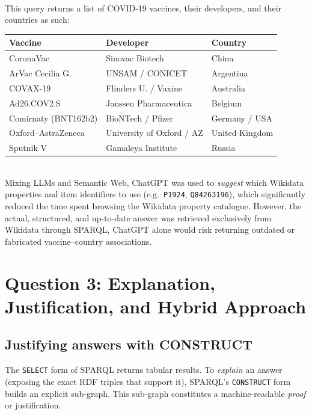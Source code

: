 \documentclass[12pt,a4paper]{article}
\begin{document}
\text{ }\\
This query returns a list of COVID-19 vaccines, their developers, and their countries as such:  
\begin{center}
\begin{tabular}{lll}
\toprule
\textbf{Vaccine} & \textbf{Developer} & \textbf{Country} \\
\midrule
CoronaVac            & Sinovac Biotech            & China \\
ArVac Cecilia G.     & UNSAM / CONICET            & Argentina \\
COVAX-19             & Flinders U. / Vaxine       & Australia \\
Ad26.COV2.S          & Janssen Pharmaceutica      & Belgium \\
Comirnaty (BNT162b2) & BioNTech / Pfizer          & Germany / USA \\
Oxford--AstraZeneca  & University of Oxford / AZ  & United Kingdom \\
Sputnik V            & Gamaleya Institute         & Russia \\
\bottomrule
\end{tabular}
\end{center}


\text{ }\\
Mixing LLMs and Semantic Web, ChatGPT was used to \emph{suggest} which
Wikidata properties and item identifiers to use (e.g.\ \texttt{P1924},
\texttt{Q84263196}), which significantly reduced the time spent browsing the
Wikidata property catalogue.
However, the actual, structured, and up-to-date answer was retrieved exclusively
from Wikidata through SPARQL, ChatGPT alone would risk returning outdated or
fabricated vaccine--country associations.

\newpage
\section{Question 3: Explanation, Justification, and Hybrid Approach}
\label{sec:q3}

\subsection{Justifying answers with CONSTRUCT}
The \texttt{SELECT} form of SPARQL returns tabular results. To \emph{explain}
an answer (exposing the exact RDF triples that support it), SPARQL's \texttt{CONSTRUCT} form builds an explicit sub-graph. 
This sub-graph constitutes a machine-readable \emph{proof} or justification.
\end{document}

